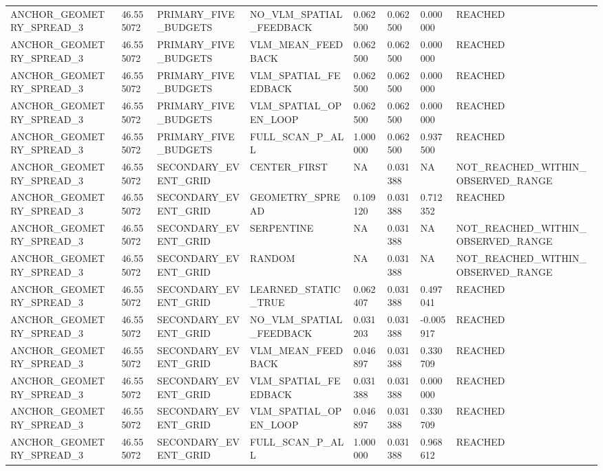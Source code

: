 \begin{tabular}{llllllll}
ANCHOR\_GEOMETRY\_SPREAD\_3 & 46.555072 & PRIMARY\_FIVE\_BUDGETS & NO\_VLM\_SPATIAL\_FEEDBACK & 0.062500 & 0.062500 & 0.000000 & REACHED \\
ANCHOR\_GEOMETRY\_SPREAD\_3 & 46.555072 & PRIMARY\_FIVE\_BUDGETS & VLM\_MEAN\_FEEDBACK & 0.062500 & 0.062500 & 0.000000 & REACHED \\
ANCHOR\_GEOMETRY\_SPREAD\_3 & 46.555072 & PRIMARY\_FIVE\_BUDGETS & VLM\_SPATIAL\_FEEDBACK & 0.062500 & 0.062500 & 0.000000 & REACHED \\
ANCHOR\_GEOMETRY\_SPREAD\_3 & 46.555072 & PRIMARY\_FIVE\_BUDGETS & VLM\_SPATIAL\_OPEN\_LOOP & 0.062500 & 0.062500 & 0.000000 & REACHED \\
ANCHOR\_GEOMETRY\_SPREAD\_3 & 46.555072 & PRIMARY\_FIVE\_BUDGETS & FULL\_SCAN\_P\_ALL & 1.000000 & 0.062500 & 0.937500 & REACHED \\
ANCHOR\_GEOMETRY\_SPREAD\_3 & 46.555072 & SECONDARY\_EVENT\_GRID & CENTER\_FIRST & NA & 0.031388 & NA & NOT\_REACHED\_WITHIN\_OBSERVED\_RANGE \\
ANCHOR\_GEOMETRY\_SPREAD\_3 & 46.555072 & SECONDARY\_EVENT\_GRID & GEOMETRY\_SPREAD & 0.109120 & 0.031388 & 0.712352 & REACHED \\
ANCHOR\_GEOMETRY\_SPREAD\_3 & 46.555072 & SECONDARY\_EVENT\_GRID & SERPENTINE & NA & 0.031388 & NA & NOT\_REACHED\_WITHIN\_OBSERVED\_RANGE \\
ANCHOR\_GEOMETRY\_SPREAD\_3 & 46.555072 & SECONDARY\_EVENT\_GRID & RANDOM & NA & 0.031388 & NA & NOT\_REACHED\_WITHIN\_OBSERVED\_RANGE \\
ANCHOR\_GEOMETRY\_SPREAD\_3 & 46.555072 & SECONDARY\_EVENT\_GRID & LEARNED\_STATIC\_TRUE & 0.062407 & 0.031388 & 0.497041 & REACHED \\
ANCHOR\_GEOMETRY\_SPREAD\_3 & 46.555072 & SECONDARY\_EVENT\_GRID & NO\_VLM\_SPATIAL\_FEEDBACK & 0.031203 & 0.031388 & -0.005917 & REACHED \\
ANCHOR\_GEOMETRY\_SPREAD\_3 & 46.555072 & SECONDARY\_EVENT\_GRID & VLM\_MEAN\_FEEDBACK & 0.046897 & 0.031388 & 0.330709 & REACHED \\
ANCHOR\_GEOMETRY\_SPREAD\_3 & 46.555072 & SECONDARY\_EVENT\_GRID & VLM\_SPATIAL\_FEEDBACK & 0.031388 & 0.031388 & 0.000000 & REACHED \\
ANCHOR\_GEOMETRY\_SPREAD\_3 & 46.555072 & SECONDARY\_EVENT\_GRID & VLM\_SPATIAL\_OPEN\_LOOP & 0.046897 & 0.031388 & 0.330709 & REACHED \\
ANCHOR\_GEOMETRY\_SPREAD\_3 & 46.555072 & SECONDARY\_EVENT\_GRID & FULL\_SCAN\_P\_ALL & 1.000000 & 0.031388 & 0.968612 & REACHED \\

\end{tabular}
